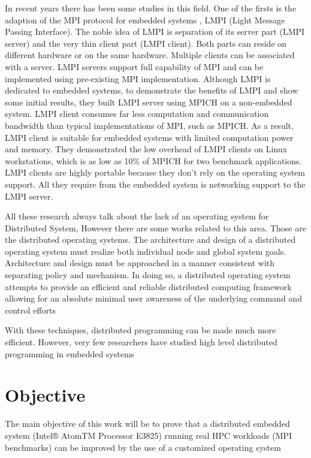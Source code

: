 \documentclass[a4paper]{article}
\begin{document}
In recent years there has been some studies in this field. One of the
firsts is the adaption of the MPI protocol for embedded systems , LMPI
\cite{Liu} (Light Message Passing Interface). The noble idea of LMPI is
separation of its server part (LMPI server) and the very thin client part (LMPI
client). Both parts can reside on different hardware or on the same hardware.
Multiple clients can be associated with a server. LMPI servers support full
capability of MPI and can be implemented using pre-existing MPI implementation.
Although LMPI is dedicated to embedded systems, to demonstrate the benefits of
LMPI and show some initial results, they built LMPI server using MPICH on a
non-embedded system. LMPI client consumes far less computation and communication
bandwidth than typical implementations of MPI, such as MPICH. As a result, LMPI
client is suitable for embedded systems with limited computation power and
memory. They demonstrated the low overhead of LMPI clients on Linux
workstations, which is as low as 10\% of MPICH for two benchmark applications.
LMPI clients are highly portable because they don't rely on the operating system
support. All they require from the embedded system is networking support to the
LMPI server.

All these research always talk about the lack of an operating system for
Distributed System, However there are some works related to this
area\cite{Sinha}. Those are the distributed operating systems. The architecture
and design of a distributed operating system must realize both individual node
and global system goals. Architecture and design must be approached in a manner
consistent with separating policy and mechanism. In doing so, a distributed
operating system attempts to provide an efficient and reliable distributed
computing framework allowing for an absolute minimal user awareness of the
underlying command and control efforts

With these techniques, distributed programming can be made much more efficient.
However, very few researchers have studied high level distributed programming in
embedded systems

\section{Objective}

The main objective of this work will be to prove that a distributed embedded
system (Intel® AtomTM Processor E3825) running real HPC workloads 
(MPI benchmarks) can be improved by the use of a customized operating system 
\end{document}
